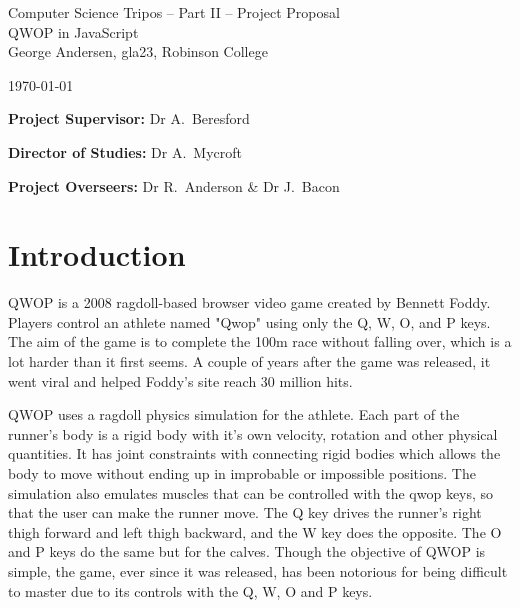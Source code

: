 \documentclass[12pt,a4paper,twoside]{article}
\begin{document}
\begin{center}
\Large
Computer Science Tripos -- Part II -- Project Proposal\\[4mm]
\LARGE
QWOP in JavaScript \\[4mm]

\large
George Andersen, gla23, Robinson College

\today

\end{center}

\vspace{5mm}

\textbf{Project Supervisor:} Dr A.~Beresford

\textbf{Director of Studies:} Dr A.~Mycroft

\textbf{Project Overseers:} Dr R.~Anderson \& Dr J.~Bacon


\section*{Introduction}

QWOP is a 2008 ragdoll-based browser video game created by Bennett Foddy. Players control an athlete named "Qwop" using only the Q, W, O, and P keys. The aim of the game is to complete the 100m race without falling over, which is a lot harder than it first seems.
A couple of years after the game was released, it went viral and helped Foddy's site reach 30 million hits.

QWOP uses a ragdoll physics simulation for the athlete. Each part of the runner's body is a rigid body with it's own velocity, rotation and other physical quantities. It has joint constraints with connecting rigid bodies which allows the body to move without ending up in improbable or impossible positions.
The simulation also emulates muscles that can be controlled with the qwop keys, so that the user can make the runner move. The Q key drives the runner's right thigh forward and left thigh backward, and the W key does the opposite. The O and P keys do the same but for the calves.
Though the objective of QWOP is simple, the game, ever since it was released, has been notorious for being difficult to master due to its controls with the Q, W, O and P keys.

\end{document}
